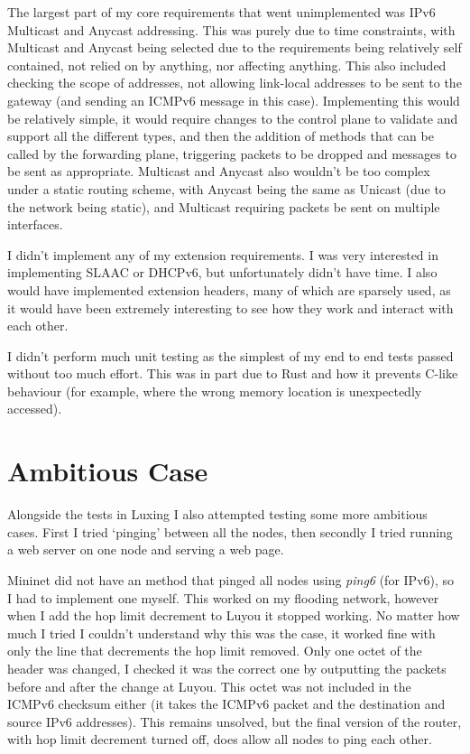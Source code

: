 \documentclass[12pt,a4paper,twoside,openright]{report}
\begin{document}
\bigskip

The largest part of my core requirements that went unimplemented was IPv6 Multicast and Anycast addressing.  This was purely due to time constraints, with Multicast and Anycast being selected due to the requirements being relatively self contained, not relied on by anything, nor affecting anything.  This also included checking the scope of addresses, not allowing link-local addresses to be sent to the gateway (and sending an ICMPv6 message in this case).  Implementing this would be relatively simple, it would require changes to the control plane to validate and support all the different types, and then the addition of methods that can be called by the forwarding plane, triggering packets to be dropped and messages to be sent as appropriate. Multicast and Anycast also wouldn't be too complex under a static routing scheme, with Anycast being the same as Unicast (due to the network being static), and Multicast requiring packets be sent on multiple interfaces.

\bigskip

I didn't implement any of my extension requirements.  I was very interested in implementing SLAAC or DHCPv6, but unfortunately didn't have time.  I also would have implemented extension headers, many of which are sparsely used, as it would have been extremely interesting to see how they work and interact with each other.

\bigskip

I didn't perform much unit testing as the simplest of my end to end tests passed without too much effort.  This was in part due to Rust and how it prevents C-like behaviour (for example, where the wrong memory location is unexpectedly accessed).

\section{Ambitious Case}

Alongside the tests in Luxing I also attempted testing some more ambitious cases.  First I tried `pinging' between all the nodes, then secondly I tried running a web server on one node and serving a web page.

\bigskip

Mininet did not have an method that pinged all nodes using \textit{ping6} (for IPv6), so I had to implement one myself.  This worked on my flooding network, however when I add the hop limit decrement to Luyou it stopped working. No matter how much I tried I couldn't understand why this was the case, it worked fine with only the line that decrements the hop limit removed. Only one octet of the header was changed, I checked it was the correct one by outputting the packets before and after the change at Luyou.  This octet was not included in the ICMPv6 checksum either (it takes the ICMPv6 packet and the destination and source IPv6 addresses).  This remains unsolved, but the final version of the router, with hop limit decrement turned off, does allow all nodes to ping each other.
\end{document}
